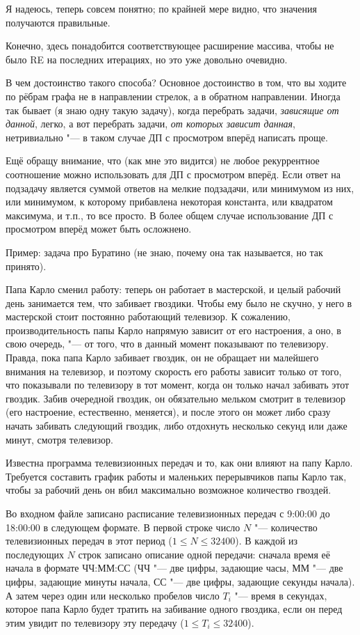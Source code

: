 Я надеюсь, теперь совсем понятно; по крайней мере видно, что значения получаются правильные.

Конечно, здесь понадобится соответствующее расширение массива, чтобы не было RE на последних итерациях, но это уже довольно очевидно.

В чем достоинство такого способа? Основное достоинство в том, что вы ходите по рёбрам графа не в направлении стрелок, а в обратном направлении. Иногда так бывает (я знаю одну такую задачу), когда перебрать задачи, \textit{зависящие от данной}, легко, а вот перебрать задачи, \textit{от которых зависит данная}, нетривиально "--- в таком случае ДП с просмотром вперёд написать проще.

Ещё обращу внимание, что (как мне это видится) не любое рекуррентное соотношение можно использовать для ДП с просмотром вперёд. Если ответ на подзадачу является суммой ответов на мелкие подзадачи, или минимумом из них, или минимумом, к которому прибавлена некоторая константа, или квадратом максимума, и т.п., то все просто. В более общем случае использование ДП с просмотром вперёд может быть осложнено.

Пример: задача про Буратино (не знаю, почему она так называется, но так принято). 

Папа Карло сменил работу: теперь он работает в мастерской, и целый рабочий день занимается тем, что
забивает гвоздики. Чтобы ему было не скучно, у него в мастерской стоит постоянно работающий
телевизор. К сожалению, производительность папы Карло напрямую зависит от его настроения, а оно, в
свою очередь, "--- от того, что в данный момент показывают по телевизору. Правда, пока папа Карло
забивает гвоздик, он не обращает ни малейшего внимания на телевизор, и поэтому скорость его работы
зависит только от того, что показывали по телевизору в тот момент, когда он только начал забивать
этот гвоздик. Забив очередной гвоздик, он обязательно мельком смотрит в телевизор (его настроение,
естественно, меняется), и после этого он может либо сразу начать забивать следующий гвоздик, либо
отдохнуть несколько секунд или даже минут, смотря телевизор.

Известна программа телевизионных передач и то, как они влияют на папу Карло. Требуется составить
график работы и маленьких перерывчиков папы Карло так, чтобы за рабочий день он вбил максимально
возможное количество гвоздей.

Во входном файле записано расписание телевизионных передач с 9:00:00 до 18:00:00 в следующем
формате. В первой строке число $N$ "--- количество телевизионных передач в этот период ($1\leq N\leq
32400$). В каждой из последующих $N$ строк записано описание одной передачи: сначала время её начала
в формате ЧЧ:ММ:СС (ЧЧ "--- две цифры, задающие часы, ММ "--- две цифры, задающие минуты начала, СС
"--- две цифры, задающие секунды начала). А затем через один или несколько пробелов число $T_i$ "---
время в секундах, которое папа Карло будет тратить на забивание одного гвоздика, если он перед этим
увидит по телевизору эту передачу ($1\leq T_i\leq 32400$).

